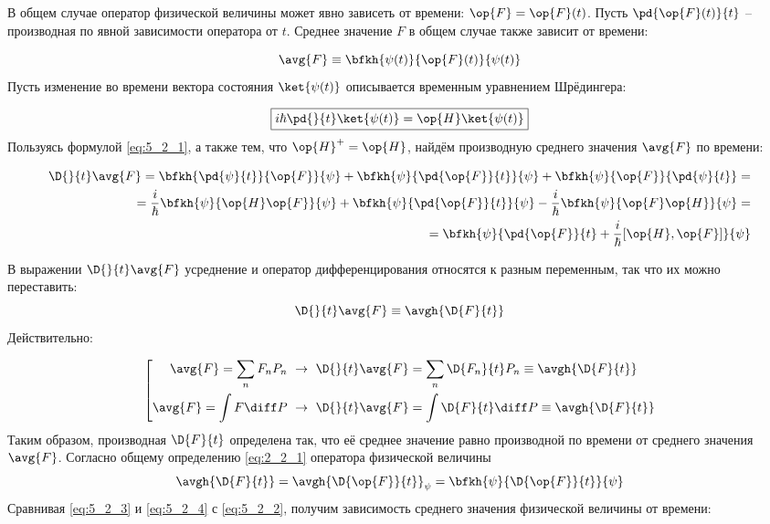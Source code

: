 В общем случае оператор физической величины может явно зависеть от времени: $\op{F}=\op{F}(t)$. Пусть $\pd{\op{F}(t)}{t}$ -- производная по явной зависимости оператора от $t$. Среднее значение $F$ в общем случае также зависит от времени:

$$
  \avg{F} \equiv \bfkh{\psi(t)}{\op{F}(t)}{\psi(t)}
$$%
%
Пусть изменение во времени вектора состояния $\ket{\psi(t)}$ описывается временным уравнением Шрёдингера\footnotemark:


\begin{equation}
  \label{eq:5_2_1}
  \boxed{
    i\hbar\pd{}{t}\ket{\psi(t)} = \op{H}\ket{\psi(t)}
  }
\end{equation}%
%
Пользуясь формулой \eqref{eq:5_2_1}, а также тем, что $\op{H}^+=\op{H}$, найдём производную среднего значения $\avg{F}$ по времени:

\begin{equation}
  \begin{split}
    \label{eq:5_2_2}
    \D{}{t} \avg{F} = \bfkh{\pd{\psi}{t}}{\op{F}}{\psi} 
        + \bfkh{\psi}{\pd{\op{F}}{t}}{\psi} + \bfkh{\psi}{\op{F}}{\pd{\psi}{t}} = \\ =
    \frac{i}{\hbar}\bfkh{\psi}{\op{H}\op{F}}{\psi} + \bfkh{\psi}{\pd{\op{F}}{t}}{\psi} -
        \frac{i}{\hbar}\bfkh{\psi}{\op{F}\op{H}}{\psi} = \\ =
    \bfkh{\psi}{\pd{\op{F}}{t}+\frac{i}{\hbar}[\op{H},\op{F}]}{\psi}
  \end{split}
\end{equation}

В выражении $\D{}{t} \avg{F}$ усреднение и оператор дифференцирования относятся к разным переменным, так что их можно переставить:
\begin{equation}
  \label{eq:5_2_3}
  \D{}{t} \avg{F} \equiv \avgh{\D{F}{t}}
\end{equation}%
%
Действительно:

$$
\left[
\begin{gathered}
  \avg{F} = \sum_n F_n P_n ~\rightarrow~ \D{}{t}\avg{F} =
    \sum_n \D{F_n}{t} P_n \equiv \avgh{\D{F}{t}}\\
  \avg{F} = \int F\diff P ~\rightarrow~ \D{}{t}\avg{F} =
    \int \D{F}{t}\diff P \equiv \avgh{\D{F}{t}}\\
\end{gathered}
\right.
$$%
%
Таким образом, производная $\D{F}{t}$ определена так, что её среднее значение равно производной по времени от среднего значения $\avg{F}$. Согласно общему определению \eqref{eq:2_2_1} оператора физической величины
\begin{equation}
  \label{eq:5_2_4}
  \avgh{\D{F}{t}} = \avgh{\D{\op{F}}{t}}_{\psi} =
    \bfkh{\psi}{\D{\op{F}}{t}}{\psi}
\end{equation}%
%
Сравнивая \eqref{eq:5_2_3} и \eqref{eq:5_2_4} с \eqref{eq:5_2_2}, получим зависимость среднего значения физической величины от времени:

